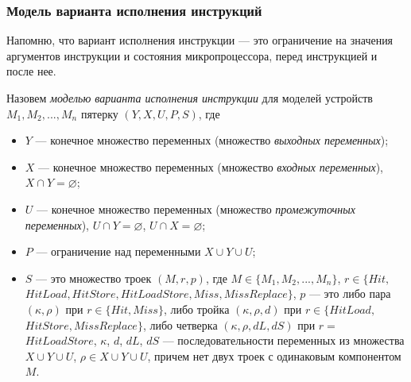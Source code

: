 %




\subsubsection*{Модель варианта исполнения инструкций}

Напомню, что вариант исполнения инструкции --- это ограничение на значения аргументов инструкции и состояния микропроцессора, перед инструкцией и после нее.



Назовем \emph{моделью варианта исполнения инструкции} для моделей устройств $M_1, M_2, ..., M_n$ пятерку $(Y, X, U, P, S)$, где
  \begin{itemize}
    \item $Y$ --- конечное множество переменных (множество \emph{выходных переменных});
    \item $X$ --- конечное множество переменных (множество \emph{входных переменных}), $X \cap Y = \varnothing$;
    \item $U$ --- конечное множество переменных (множество \emph{промежуточных переменных}), $U \cap Y = \varnothing$, $U \cap X = \varnothing$;
    \item $P$ --- ограничение над переменными $X \cup Y \cup U$;
    \item $S$ --- это множество троек $(M, r, p)$, где $M \in \{M_1, M_2, ..., M_n\}$, $r \in \{Hit,$ $HitLoad, HitStore, HitLoadStore, Miss, MissReplace\}$, $p$ --- это либо пара $(\kappa, \rho)$ при $r \in \{Hit, Miss\}$, либо тройка $(\kappa, \rho, d)$ при $r \in \{HitLoad,$ $HitStore, MissReplace\}$, либо четверка $(\kappa, \rho, dL, dS)$ при $r =$ $HitLoadStore$, $\kappa$, $d$, $dL$, $dS$ --- последовательности переменных из множества $X \cup Y \cup U$, $\rho \in X \cup Y \cup U$, причем нет двух троек с одинаковым компонентом $M$.
  \end{itemize}

